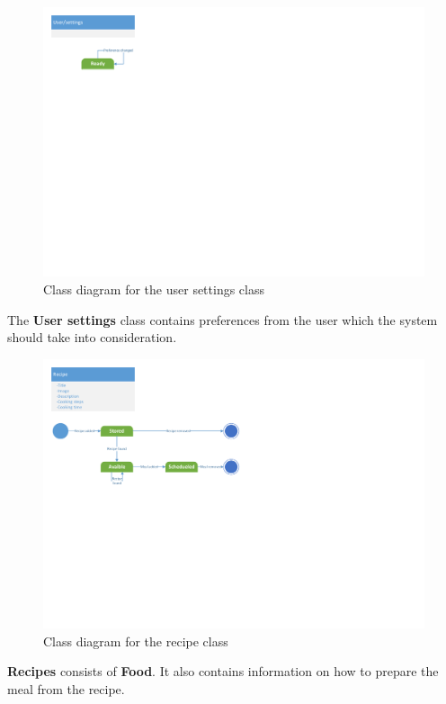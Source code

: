 \begin{figure}[H]
	\centering
	\includegraphics[clip=true, trim=0.5cm 15.5cm 22.5cm 0.5cm]{Development/ProblemDomain/UserSettingsClass.pdf}
	\caption{Class diagram for the user settings class} \label{UserSettingsClass}
\end{figure}
The \textbf{User settings} class contains preferences from the user which the system should take into consideration.

\begin{figure}[H]
	\centering
	\includegraphics[clip=true, trim=0.5cm 11cm 14cm 0.5cm]{Development/ProblemDomain/RecipeClass.pdf}
	\caption{Class diagram for the recipe class} \label{RecipeClass}
	\end{figure}
\textbf{Recipes} consists of \textbf{Food}. It also contains information on how to prepare the meal from the recipe.

